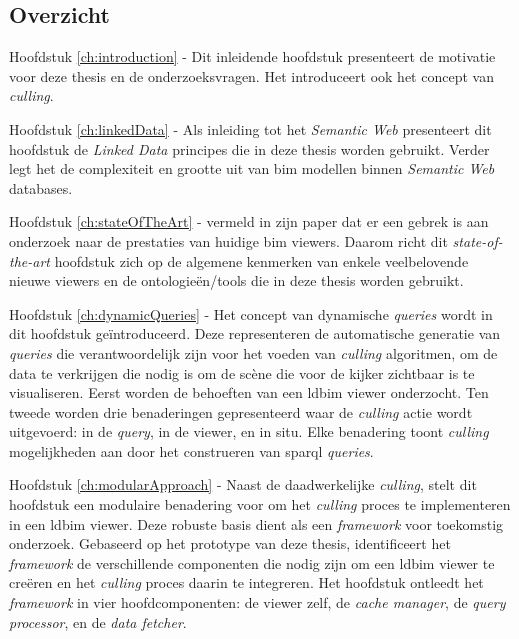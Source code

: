 \begin{refsection}
\begin{multicols}{2}
        \subsection*{Overzicht}
        \textsf{Hoofdstuk \ref{ch:introduction} -}
        Dit inleidende hoofdstuk presenteert de motivatie voor deze thesis en de onderzoeksvragen. Het introduceert ook het concept van \emph{culling}.

        \textsf{Hoofdstuk \ref{ch:linkedData} -}
        Als inleiding tot het \emph{Semantic Web} presenteert dit hoofdstuk de \emph{Linked Data} principes die in deze thesis worden gebruikt. Verder legt het de complexiteit en grootte uit van \ac{bim} modellen binnen \emph{Semantic Web} databases.

        \textsf{Hoofdstuk \ref{ch:stateOfTheArt} -}
        \cite{Johansson2015} vermeld in zijn paper dat er een gebrek is aan onderzoek naar de prestaties van huidige \ac{bim} viewers. Daarom richt dit \emph{state-of-the-art} hoofdstuk zich op de algemene kenmerken van enkele veelbelovende nieuwe viewers en de ontologieën/tools die in deze thesis worden gebruikt.

        \textsf{Hoofdstuk \ref{ch:dynamicQueries} -}
        Het concept van dynamische \emph{queries} wordt in dit hoofdstuk geïntroduceerd. Deze representeren de automatische generatie van \emph{queries} die verantwoordelijk zijn voor het voeden van \emph{culling} algoritmen, om de data te verkrijgen die nodig is om de scène die voor de kijker zichtbaar is te visualiseren. Eerst worden de behoeften van een \ac{ldbim} viewer onderzocht. Ten tweede worden drie benaderingen gepresenteerd waar de \emph{culling} actie wordt uitgevoerd: in de \emph{query}, in de viewer, en in situ. Elke benadering toont \emph{culling} mogelijkheden aan door het construeren van \ac{sparql} \emph{queries}.

        \textsf{Hoofdstuk \ref{ch:modularApproach} -}
        Naast de daadwerkelijke \emph{culling}, stelt dit hoofdstuk een modulaire benadering voor om het \emph{culling} proces te implementeren in een \ac{ldbim} viewer. Deze robuste basis dient als een \emph{framework} voor toekomstig onderzoek. Gebaseerd op het prototype van deze thesis, identificeert het \emph{framework} de verschillende componenten die nodig zijn om een \ac{ldbim} viewer te creëren en het \emph{culling} proces daarin te integreren. Het hoofdstuk ontleedt het \emph{framework} in vier hoofdcomponenten: de viewer zelf, de \emph{cache manager}, de \emph{query processor}, en de \emph{data fetcher}.


\end{multicols}
\end{refsection}

